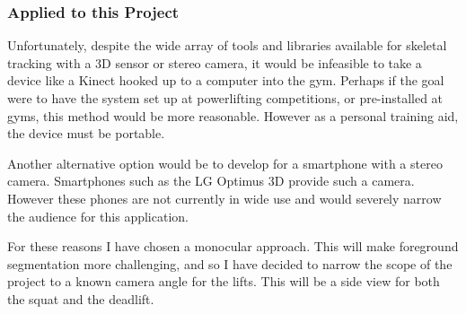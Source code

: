 \subsubsection{Applied to this Project}

Unfortunately, despite the wide array of tools and libraries available for skeletal tracking with a 3D sensor or stereo camera, it would be infeasible to take a device like a Kinect hooked up to a computer into the gym. Perhaps if the goal were to have the system set up at powerlifting competitions, or pre-installed at gyms, this method would be more reasonable. However as a personal training aid, the device must be portable.

Another alternative option would be to develop for a smartphone with a stereo camera. Smartphones such as the LG Optimus 3D\cite{lgoptimus} provide such a camera. However these phones are not currently in wide use and would severely narrow the audience for this application.

For these reasons I have chosen a monocular approach. This will make foreground segmentation more challenging, and so I have decided to narrow the scope of the project to a known camera angle for the lifts. This will be a side view for both the squat and the deadlift.